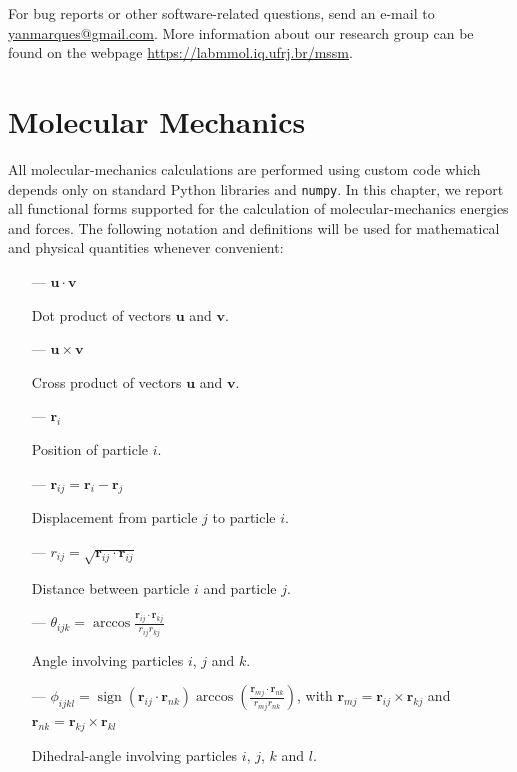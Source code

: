 \documentclass[10pt,a4paper,openany]{memoir}
\numberwithin{equation}{section}
\DeclareMathOperator{\sign}{sign}
\newcommand{\rsub}[1]{\mathbf{r}_{#1}}
\begin{document}
  For bug reports or other software-related questions, send an e-mail
  to \url{yanmarques@gmail.com}.  More information about our research
  group can be found on the webpage
  \url{https://labmmol.iq.ufrj.br/mssm}.

\tableofcontents

  \mainmatter

\newcommand*{\profi}{\texttt{profilerOpt}}

\chapter{Molecular Mechanics}
\label{chap:mm}

All molecular-mechanics calculations are performed using custom code which depends only on standard Python libraries and \texttt{numpy}.
In this chapter, we report all functional forms supported for the
calculation of molecular-mechanics energies and forces.
The following notation and definitions will be used for mathematical and physical quantities whenever convenient:

\begin{itemize}
\item[---] $\mathbf{u} \cdot \mathbf{v}$ \par \hspace{10ex} Dot product of vectors $\mathbf{u}$ and $\mathbf{v}$.
\item[---] $\mathbf{u} \times \mathbf{v}$ \par \hspace{10ex} Cross product of vectors $\mathbf{u}$ and $\mathbf{v}$.
\item[---] $\mathbf{r}_i$ \par \hspace{10ex} Position of particle $i$.
\item[---] $\mathbf{r}_{ij} = \mathbf{r}_i - \mathbf{r}_j$ \par \hspace{10ex} Displacement from particle $j$ to particle $i$.
\item[---] $r_{ij} = \sqrt{\mathbf{r}_{ij} \cdot \mathbf{r}_{ij}}$ \par \hspace{10ex} Distance between particle $i$ and particle $j$.
\item [---] $\theta_{ijk} = \arccos{\frac{\mathbf{r}_{ij} \cdot \mathbf{r}_{kj}}{r_{ij}r_{kj}}}$  \par \hspace{10ex} Angle involving particles $i$, $j$ and $k$.
  \item [---] $\phi_{ijkl} = \sign{(\rsub{ij} \cdot \rsub{nk})} \arccos{\left( \frac{\rsub{mj} \cdot \rsub{nk}}{r_{mj}r_{nk}} \right)}$, with $\rsub{mj} = \rsub{ij}\times\rsub{kj}$ and $\rsub{nk} = \rsub{kj}\times\rsub{kl}$
     \par \hspace{10ex} Dihedral-angle involving particles $i$, $j$, $k$ and $l$.
   \end{itemize}
\end{document}
